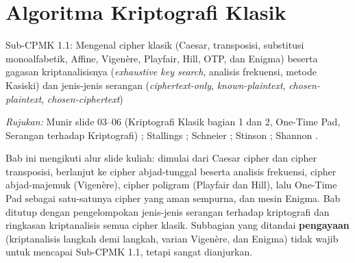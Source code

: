 \documentclass[main.tex]{subfiles}
\begin{document}
\chapter{Algoritma Kriptografi Klasik}

\begin{subcpmk}
  \item Sub-CPMK 1.1: Mengenal cipher klasik (Caesar, transposisi, substitusi monoalfabetik, Affine, Vigen\`{e}re, Playfair, Hill, OTP, dan Enigma) beserta gagasan kriptanalisisnya (\textit{exhaustive key search}, analisis frekuensi, metode Kasiski) dan jenis-jenis serangan (\textit{ciphertext-only}, \textit{known-plaintext}, \textit{chosen-plaintext}, \textit{chosen-ciphertext})
\end{subcpmk}

\noindent\textit{Rujukan:} Munir slide 03--06 (Kriptografi Klasik bagian 1 dan 2, One-Time Pad, Serangan terhadap Kriptografi) \cite{munir_slides_itb}; Stallings \cite{stallings2017}; Schneier \cite{schneier1996}; Stinson \cite{stinson2018}; Shannon \cite{shannon1949}.

Bab ini mengikuti alur slide kuliah: dimulai dari Caesar cipher dan cipher transposisi, berlanjut ke cipher abjad-tunggal beserta analisis frekuensi, cipher abjad-majemuk (Vigen\`{e}re), cipher poligram (Playfair dan Hill), lalu One-Time Pad sebagai satu-satunya cipher yang aman sempurna, dan mesin Enigma. Bab ditutup dengan pengelompokan jenis-jenis serangan terhadap kriptografi dan ringkasan kriptanalisis semua cipher klasik. Subbagian yang ditandai \textbf{pengayaan} (kriptanalisis langkah demi langkah, varian Vigen\`{e}re, dan Enigma) tidak wajib untuk mencapai Sub-CPMK 1.1, tetapi sangat dianjurkan.














\end{document}
